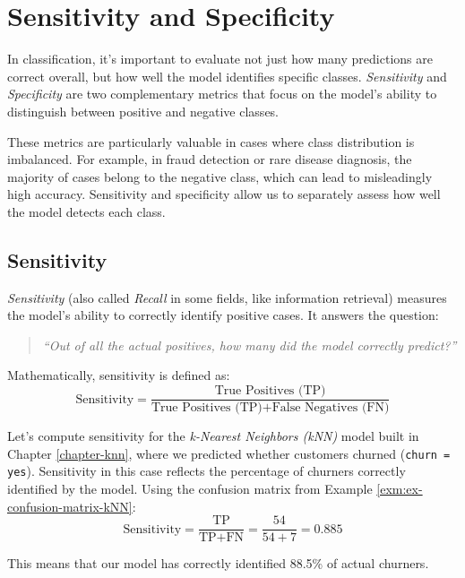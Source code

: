 \documentclass[
]{book}
\newcommand{\passthrough}[1]{#1}
\theoremstyle{definition}
\theoremstyle{definition}
\theoremstyle{definition}
\theoremstyle{definition}
\theoremstyle{remark}
\begin{document}
\section{Sensitivity and Specificity}\label{sensitivity-and-specificity}

In classification, it's important to evaluate not just how many predictions are correct overall, but how well the model identifies specific classes. \emph{Sensitivity} and \emph{Specificity} are two complementary metrics that focus on the model's ability to distinguish between positive and negative classes.

These metrics are particularly valuable in cases where class distribution is imbalanced. For example, in fraud detection or rare disease diagnosis, the majority of cases belong to the negative class, which can lead to misleadingly high accuracy. Sensitivity and specificity allow us to separately assess how well the model detects each class.

\subsection*{Sensitivity}\label{sensitivity}

\emph{Sensitivity} (also called \emph{Recall} in some fields, like information retrieval) measures the model's ability to correctly identify positive cases. It answers the question:

\begin{quote}
\emph{``Out of all the actual positives, how many did the model correctly predict?''}
\end{quote}

Mathematically, sensitivity is defined as:\\
\[
\text{Sensitivity} = \frac{\text{True Positives (TP)}}{\text{True Positives (TP)} + \text{False Negatives (FN)}}
\]

Let's compute sensitivity for the \emph{k-Nearest Neighbors (kNN)} model built in Chapter \ref{chapter-knn}, where we predicted whether customers churned (\passthrough{\lstinline!churn = yes!}). Sensitivity in this case reflects the percentage of churners correctly identified by the model. Using the confusion matrix from Example \ref{exm:ex-confusion-matrix-kNN}:\\
\[
\text{Sensitivity} = \frac{\text{TP}}{\text{TP} + \text{FN}} = \frac{54}{54 + 7} = 0.885
\]

This means that our model has correctly identified 88.5\% of actual churners.
\end{document}
